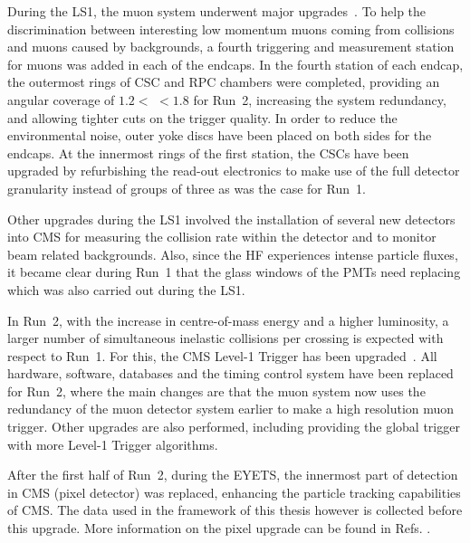  During the LS1, the  muon system underwent major upgrades~\cite{Guiducci:1966038,Battilana:2239185}. To help the discrimination between interesting low momentum muons coming from collisions and muons caused by backgrounds, a fourth triggering and measurement station for muons was added in each of the endcaps. In the fourth station of each endcap, the outermost rings of CSC and RPC chambers were completed, providing an angular coverage of $1.2<$ \abspsrap $<1.8$ for Run~2, increasing the system redundancy, and allowing tighter cuts on the trigger quality. In order to reduce the environmental noise, outer yoke discs have been placed on both sides for the endcaps. 
At the innermost rings of the first station, the CSCs have been upgraded by refurbishing the read-out electronics to make use of the full detector granularity instead of groups of three as was the case for Run~1. 


Other upgrades during the LS1 involved the installation of several new detectors into CMS for measuring the collision rate within the detector and to monitor beam related backgrounds. Also, since the HF experiences intense particle fluxes, it became clear during Run~1 that the glass windows of the PMTs need replacing which was also carried out during the LS1. 




In Run~2, with the increase in centre-of-mass energy and a higher luminosity, a larger number of simultaneous inelastic collisions per crossing is expected with respect to Run~1. For this, the CMS Level-1 Trigger has been upgraded~\cite{1748-0221-12-03-C03021}. All hardware, software, databases and the timing control system have been replaced for Run~2, where the main changes are that the muon system now uses the redundancy of the muon detector system earlier to make a high resolution muon trigger. Other upgrades are also performed, including providing the global trigger with more Level-1 Trigger algorithms. 


After the first half of Run~2, during the EYETS, the innermost part of detection in CMS (pixel detector) was replaced, enhancing the particle tracking capabilities of CMS. The data used in the framework of this thesis however is collected before this upgrade. More information on the pixel upgrade can be found in Refs. \cite{CMS:2012sda,Perrey:1644757}.

